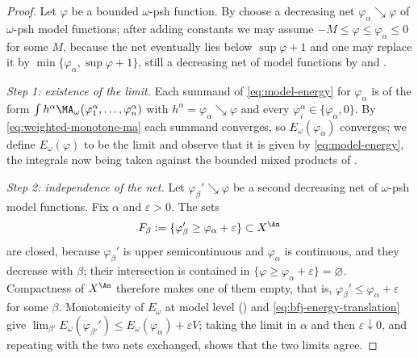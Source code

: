 \begin{proof}
Let \(\varphi\) be a bounded \(\omega\)-psh function.  By
 choose a decreasing net
\(\varphi_\alpha\searrow\varphi\) of \(\omega\)-psh model functions; after
adding constants we may assume \(-M\leq\varphi\leq\varphi_\alpha\leq0\) for
some \(M\), because the net eventually lies below \(\sup\varphi+1\) and one
may replace it by \(\min\{\varphi_\alpha,\sup\varphi+1\}\), still a
decreasing net of model functions by
 and .

\emph{Step 1: existence of the limit.}  Each summand of
\eqref{eq:model-energy} for \(\varphi_\alpha\) is of the form
\(\int h^\alpha\MA_\omega(\varphi_1^\alpha,\ldots,\varphi_n^\alpha)\) with
\(h^\alpha=\varphi_\alpha\searrow\varphi\) and every
\(\varphi_i^\alpha\in\{\varphi_\alpha,0\}\).  By
\eqref{eq:weighted-monotone-ma} each summand converges, so
\(E_\omega(\varphi_\alpha)\) converges; we define \(E_\omega(\varphi)\) to be
the limit and observe that it is given by \eqref{eq:model-energy}, the
integrals now being taken against the bounded mixed products of
.

\emph{Step 2: independence of the net.}  Let \(\varphi_\beta'\searrow\varphi\)
be a second decreasing net of \(\omega\)-psh model functions.  Fix
\(\alpha\) and \(\varepsilon>0\).  The sets
\[
 F_\beta:=\{\varphi_\beta'\geq\varphi_\alpha+\varepsilon\}\subset X^{\An}
\]
are closed, because \(\varphi_\beta'\) is upper semicontinuous and
\(\varphi_\alpha\) is continuous, and they decrease with \(\beta\); their
intersection is contained in
\(\{\varphi\geq\varphi_\alpha+\varepsilon\}=\varnothing\).  Compactness of
\(X^{\An}\) therefore makes one of them empty, that is,
\(\varphi_\beta'\leq\varphi_\alpha+\varepsilon\) for some \(\beta\).
Monotonicity of \(E_\omega\) at model level
() and
\eqref{eq:bfj-energy-translation} give
\(\lim_{\beta'}E_\omega(\varphi_{\beta'}')\leq
E_\omega(\varphi_\alpha)+\varepsilon V\); taking the limit in \(\alpha\) and
then \(\varepsilon\downarrow0\), and repeating with the two nets exchanged,
shows that the two limits agree.


\end{proof}
